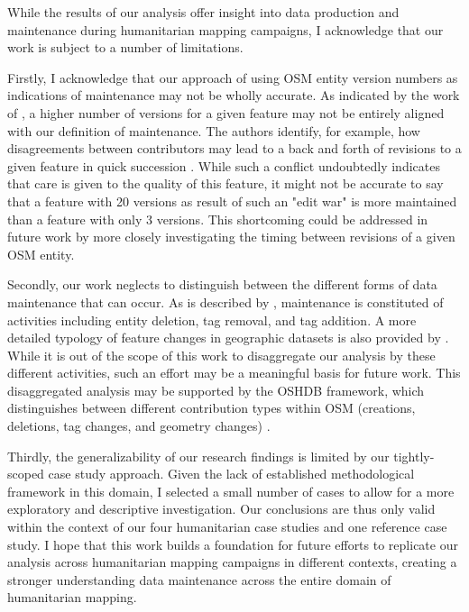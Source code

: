 While the results of our analysis offer insight into data production and maintenance during humanitarian mapping campaigns, I acknowledge that our work is subject to a number of limitations. 

Firstly, I acknowledge that our approach of using OSM entity version numbers as indications of maintenance may not be wholly accurate. As indicated by the work of \textcite{mooney_characteristics_2012}, a higher number of versions for a given feature may not be entirely aligned with our definition of maintenance. The authors identify, for example, how disagreements between contributors may lead to a back and forth of revisions to a given feature in quick succession \textcite{mooney_characteristics_2012}. While such a conflict undoubtedly indicates that care is given to the quality of this  feature, it might not be accurate to say that a feature with 20 versions as result of such an "edit war" is more maintained than a feature with only 3 versions. This shortcoming could be addressed in future work by more closely investigating the timing between revisions of a given OSM entity. 

Secondly, our work neglects to distinguish between the different forms of data maintenance that can occur. As is described by \textcite{quattrone_work_2017}, maintenance is constituted of activities including entity deletion, tag removal, and tag addition. A more detailed typology of feature changes in geographic datasets is also provided by \textcite{rehrl_towards_2015}. While it is out of the scope of this work to disaggregate our analysis by these different activities, such an effort may be a meaningful basis for future work. This disaggregated analysis may be supported by the OSHDB framework, which distinguishes between different contribution types within OSM (creations, deletions, tag changes, and geometry changes) \parencite{heidelberg_institute_for_geoinformation_technology_oshdb_2020}. 

Thirdly, the generalizability of our research findings is limited by our tightly-scoped case study approach. Given the lack of established methodological framework in this domain, I selected a small number of cases to allow for a more exploratory and descriptive investigation. Our conclusions are thus only valid within the context of our four humanitarian case studies and one reference case study. I hope that this work builds a foundation for future efforts to replicate our analysis across humanitarian mapping campaigns in different contexts, creating a stronger understanding data maintenance across the entire domain of humanitarian mapping. 



